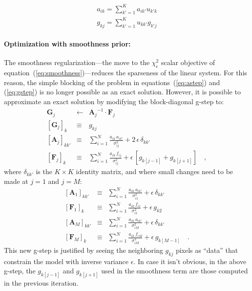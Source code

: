 \documentclass[12pt,preprint]{aastex}
\newcommand{\equationname}{equation}
\newcommand{\tv}[1]{\boldsymbol{#1}}
\newcommand{\inverse}[1]{{#1}^{-1}}
\begin{document}
\begin{eqnarray}\label{eq:ordering}
a_{ik}=\sum_{k'=1}^{K}a_{ik'}u_{k'k} \nonumber\\
g_{kj}=\sum_{k'=1}^{K}u_{kk'}g_{k'j}
\end{eqnarray}

\paragraph{Optimization with smoothness prior:}

The smoothness regularization---the move to the $\chi^2_{\epsilon}$
scalar objective of \equationname~(\ref{eq:smoothness})---reduces the
sparseness of the linear system.  For this reason, the simple blocking
of the problem in {\equationname}s~(\ref{eq:astep}) and
(\ref{eq:gstep}) is no longer possible as an exact solution.  However,
it is possible to approximate an exact solution by modifying the
block-diagonal g-step to:
\begin{eqnarray}\label{eq:gstep_smooth}\displaystyle
\tv{G}_j & \gets & \inverse{\tv{A}_j}\cdot\tv{F}_j \nonumber\\
\left[\tv{G}_j\right]_k & \equiv & g_{kj} \nonumber\\
\left[\tv{A}_j\right]_{kk'} & \equiv & \sum_{i=1}^{N} \frac{a_{ik}\,a_{ik'}}{\sigma_{ij}^2} + 2\,\epsilon\,\delta_{kk'} \nonumber\\
\left[\tv{F}_j\right]_k     & \equiv & \sum_{i=1}^{N} \frac{a_{ik}\,f_{i j}}{\sigma_{ij}^2} + \epsilon\,[g_{k[j-1]} + g_{k[j+1]}]
\quad ,
\end{eqnarray}
where $\delta_{kk'}$ is the $K\times K$ identity matrix, and where
small changes need to be made at $j=1$ and $j=M$:
\begin{eqnarray}\label{eq:gstep_tweaks}\displaystyle
\left[\tv{A}_1\right]_{kk'} & \equiv & \sum_{i=1}^{N} \frac{a_{ik}\,a_{ik'}}{\sigma_{i1}^2} + \epsilon\,\delta_{kk'} \nonumber\\
\left[\tv{F}_1\right]_k     & \equiv & \sum_{i=1}^{N} \frac{a_{ik}\,f_{i 1}}{\sigma_{i1}^2} + \epsilon\,g_{k2} \nonumber\\
\left[\tv{A}_M\right]_{kk'} & \equiv & \sum_{i=1}^{N} \frac{a_{ik}\,a_{ik'}}{\sigma_{iM}^2} + \epsilon\,\delta_{kk'} \nonumber\\
\left[\tv{F}_M\right]_k     & \equiv & \sum_{i=1}^{N} \frac{a_{ik}\,f_{i M}}{\sigma_{iM}^2} + \epsilon\,g_{k[M-1]}
\quad .
\end{eqnarray}
This new g-step is justified by seeing the neighboring $g_{kj}$ pixels
as ``data'' that constrain the model with inverse variance $\epsilon$.
In case it isn't obvious, in the above g-step, the $g_{k[j-1]}$ and
$g_{k[j+1]}$ used in the smoothness term are those computed in the
previous iteration.
\end{document}
